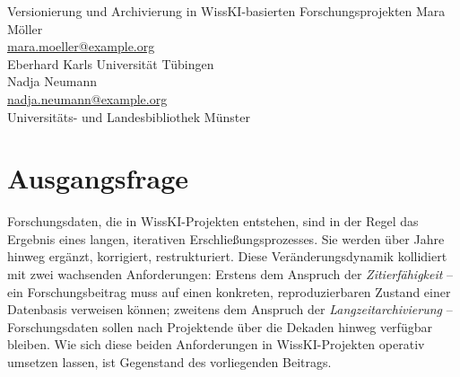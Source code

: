 \graphicspath{{abstracts/praesentationen/07-versionierung-archivierung/img/}{img/}}

\begin{beitrag}{Versionierung und Archivierung in WissKI-basierten Forschungsprojekten}{%
Mara Möller\, \\
\small \href{mailto:mara.moeller@example.org}{mara.moeller@example.org} \\
\small Eberhard Karls Universität Tübingen \\[0.5cm]
Nadja Neumann\, \\
\small \href{mailto:nadja.neumann@example.org}{nadja.neumann@example.org} \\
\small Universitäts- und Landesbibliothek Münster
}

\begin{abstract}
Der Beitrag behandelt Zitierfähigkeit und Langzeitarchivierung von WissKI-Forschungsdaten und unterscheidet drei Versionierungsebenen: redaktionelle Versionierung über Drupal-Revisionen, halbjährliche Schnappschuss-Versionierung als DOI-versehener RDF-Dump in einem institutionellen Repositorium sowie eine abschließende Archivversion als dokumentiertes Submission Information Package gemeinsam mit der Universitätsbibliothek. Empfohlen wird, Versionierung und Archivierung von Beginn an als kontinuierliche Aufgaben einzuplanen und das Archivformat in etablierten RDF-Standards (Turtle, N-Quads) statt in proprietären Triplestore-Exporten zu wählen.
\end{abstract}

\section{Ausgangsfrage}
Forschungsdaten, die in WissKI-Projekten entstehen, sind in der Regel das Ergebnis eines langen, iterativen Erschließungsprozesses. Sie werden über Jahre hinweg ergänzt, korrigiert, restrukturiert. Diese Veränderungsdynamik kollidiert mit zwei wachsenden Anforderungen: Erstens dem Anspruch der \emph{Zitierfähigkeit} -- ein Forschungsbeitrag muss auf einen konkreten, reproduzierbaren Zustand einer Datenbasis verweisen können; zweitens dem Anspruch der \emph{Langzeitarchivierung} -- Forschungsdaten sollen nach Projektende über die Dekaden hinweg verfügbar bleiben. Wie sich diese beiden Anforderungen in WissKI-Projekten operativ umsetzen lassen, ist Gegenstand des vorliegenden Beitrags.


\end{beitrag}
